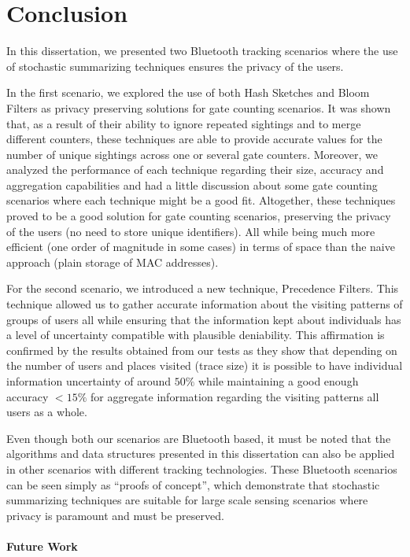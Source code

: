 \chapter{Conclusion}
\label{cha:conclusion}

In this dissertation, we presented two Bluetooth tracking scenarios
where the use of stochastic summarizing techniques ensures the privacy
of the users.

In the first scenario, we explored the use of both Hash Sketches and
Bloom Filters as privacy preserving solutions for gate counting
scenarios.  It was shown that, as a result of their ability to ignore
repeated sightings and to merge different counters, these techniques
are able to provide accurate values for the number of unique sightings
across one or several gate counters.  Moreover, we analyzed the
performance of each technique regarding their size, accuracy and
aggregation capabilities and had a little discussion about some gate
counting scenarios where each technique might be a good
fit. Altogether, these techniques proved to be a good solution for gate
counting scenarios, preserving the privacy of the users (no need to
store unique identifiers). All while being much more efficient (one
order of magnitude in some cases) in terms of space than the naive
approach (plain storage of MAC addresses).


For the second scenario, we introduced a new technique, Precedence
Filters. This technique allowed us to gather accurate information
about the visiting patterns of groups of users all while ensuring that
the information kept about individuals has a level of uncertainty
compatible with plausible deniability.  This affirmation is confirmed
by the results obtained from our tests as they show that depending on
the number of users and places visited (trace size) it is possible to
have individual information uncertainty of around $50\%$ while
maintaining a good enough accuracy $  <15\%$ for aggregate information
regarding the visiting patterns all users as a whole.


Even though both our scenarios are Bluetooth based, it must be noted
that the algorithms and data structures presented in this dissertation
can also be applied in other scenarios with different tracking
technologies. These Bluetooth scenarios can be seen simply as ``proofs of
concept'', which demonstrate that stochastic summarizing techniques are
suitable for large scale sensing scenarios where privacy is paramount
and must be preserved.


\subsubsection{Future Work}
\label{sec:future-work}

